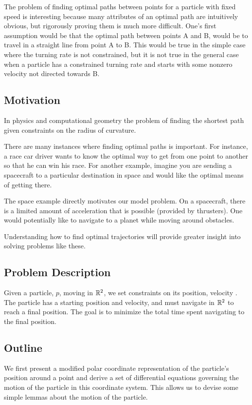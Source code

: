 The problem of finding optimal paths between points for a particle with fixed speed is interesting because many attributes of an optimal path are intuitively obvious, but rigorously proving them is much more difficult. One's first assumption would be that the optimal path between points A and B, would be to travel in a straight line from point A to B. This would be true in the simple case where the turning rate is not constrained, but it is not true in the general case when a particle has a constrained turning rate and starts with some nonzero velocity not directed towards B. 


\subsection{Motivation}

In physics and computational geometry the problem of finding the shortest path given constraints on the radius of curvature.

There are many instances where finding optimal paths is important. For instance, a race car driver wants to know the optimal way to get from one point to another so that he can win his race. For another example, imagine you are sending a spacecraft to a particular destination in space and would like the optimal means of getting there.

The space example directly motivates our model problem. On a spacecraft, there is a limited amount of acceleration that is possible (provided by thrusters). One would potentially like to navigate to a planet while moving around obstacles. 

Understanding how to find optimal trajectories will provide greater insight into solving problems like these.

\subsection{Problem Description}

Given a particle, $p$, moving in $\mathbb R^2$, we set constraints on its position, velocity . The particle has a starting position and velocity, and must navigate in $\mathbb R^2$ to reach a final position. The goal is to minimize the total time spent navigating to the final position. 

\subsection{Outline}

We first present a modified polar coordinate representation of the particle's position around a point and derive a set of differential equations governing the motion of the particle in this coordinate system. This allows us to devise some simple lemmas about the motion of the particle.
